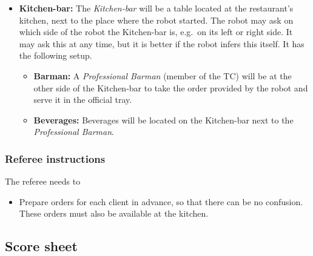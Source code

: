 \begin{itemize}
	\item \textbf{Kitchen-bar:} The \textit{Kitchen-bar} will be a table located at the restaurant's kitchen, next to the place where the robot started.
	The robot may ask on which side of the robot the Kitchen-bar is, e.g.~on its left or right side. It may ask this at any time, but it is better if the robot infers this itself.
	It has the following setup.
	\begin{itemize}
		\item \textbf{Barman:} A \textit{Professional Barman} (member of the TC) will be at the other side of the Kitchen-bar to take the order provided by the robot and serve it in the official tray.
		\item \textbf{Beverages:} Beverages will be located on the Kitchen-bar next to the \textit{Professional Barman}.
	\end{itemize}

\end{itemize}


\subsubsection{Referee instructions}

The referee needs to
\begin{itemize}
  \item Prepare orders for each client in advance, so that there can be no confusion. These orders must also be available at the kitchen.
\end{itemize}



\newpage
\subsection{Score sheet}


